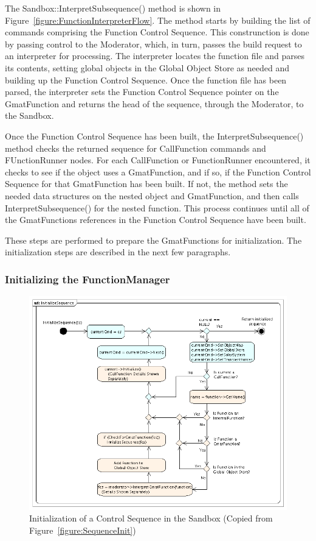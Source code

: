 The Sandbox::InterpretSubsequence() method is shown in Figure~\ref{figure:FunctionInterpreterFlow}. 
The method starts by building the list of commands comprising the Function Control Sequence.  
This construnction is done by passing control to the Moderator, which, in turn, passes the build
request to an interpreter for processing.  The interpreter locates the function file and parses its
contents, setting global objects in the Global Object Store as needed and building up the Function
Control Sequence.  Once the function file has been parsed, the interpreter sets the Function Control
Sequence pointer on the GmatFunction and returns the head of the sequence, through the Moderator, to
the Sandbox.

Once the Function Control Sequence has been built, the InterpretSubsequence() method checks the
returned sequence for CallFunction commands and FUnctionRunner nodes.  For each CallFunction or
FunctionRunner encountered, it checks to see if the object uses a GmatFunction, and if so, if
the Function Control Sequence for that GmatFunction has been built.  If not, the method sets the
needed data structures on the nested object and GmatFunction, and then calls InterpretSubsequence()
for the nested function.  This process continues until all of the GmatFunctions references in the
Function Control Sequence have been built.

These steps are performed to prepare the GmatFunctions for initialization.  The initialization
steps are described in the next few paragraphs.

\subsubsection{Initializing the FunctionManager}

\begin{figure}[htb]
\begin{center}
\includegraphics[378,312]{Images/InitializeSequence.png}
\caption{\label{figure:SequenceInitGmatFunctionRecap}Initialization of a Control Sequence in the
Sandbox (Copied from Figure~\ref{figure:SequenceInit})}
\end{center}
\end{figure}

